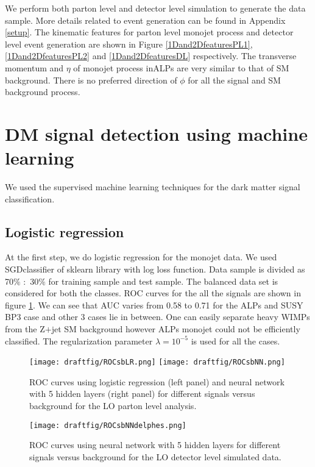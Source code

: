 \documentclass[aps,onecolumn,showpacs,superscriptaddress,groupedaddress,nofootinbib,preprint]{revtex4-1}
\begin{document}
We perform both parton level and detector level simulation to generate the data sample. More details related to event 
generation can be found in Appendix \ref{setup}. The kinematic features for parton level monojet process and detector 
level event generation are shown in Figure \ref{1Dand2DfeaturesPL1},\ref{1Dand2DfeaturesPL2} and \ref{1Dand2DfeaturesDL} respectively.
 The transverse momentum and $\eta$ of monojet process inALPs are very similar to that of SM background. There is no preferred direction of $\phi$ for all 
 the signal and SM background process.
\section{DM signal detection using machine learning}
We used the supervised machine learning techniques for the dark matter signal classification.
\subsection{Logistic regression} 
At the first step, we do logistic regression for the monojet data. We used SGDclassifier of sklearn library with log loss function. Data sample is divided as 
70$\%$ $:$ 30$\%$ for training sample and test sample. The balanced data set is considered for both the classes. ROC curves for the all the  signals are shown in figure \ref{rocLO-LR-NN}. We can see that AUC varies from 0.58 to 0.71 for the ALPs and SUSY BP3 case and 
other 3 cases lie in between. One can easily separate heavy WIMPs from the Z$+$jet SM background however ALPs monojet could not be efficiently classified.
The regularization parameter $\lambda= 10^{-5}$ is used for all the cases.



\begin{figure}%
\centering
\texttt{[image: draftfig/ROCsbLR.png]}
\texttt{[image: draftfig/ROCsbNN.png]}
\caption{ROC curves using logistic regression (left panel) and neural network with 5 hidden layers (right panel) for different signals versus background for the LO parton level analysis. 
}\label{rocLO-LR-NN}
\end{figure}


\begin{figure}%
\centering
\texttt{[image: draftfig/ROCsbNNdelphes.png]}
\caption{ROC curves using neural network with 5 hidden layers for different signals versus background for the LO detector level simulated data. 
}\label{roc-LOdelphes-NN}
\end{figure}
\end{document}
